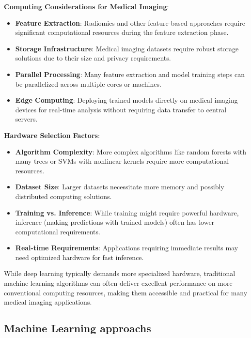 \textbf{Computing Considerations for Medical Imaging}:
\begin{itemize}
  \item \textbf{Feature Extraction}: Radiomics and other feature-based approaches require significant computational resources during the feature extraction phase.

  \item \textbf{Storage Infrastructure}: Medical imaging datasets require robust storage solutions due to their size and privacy requirements.

  \item \textbf{Parallel Processing}: Many feature extraction and model training steps can be parallelized across multiple cores or machines.

  \item \textbf{Edge Computing}: Deploying trained models directly on medical imaging devices for real-time analysis without requiring data transfer to central servers.
\end{itemize}

\textbf{Hardware Selection Factors}:
\begin{itemize}
  \item \textbf{Algorithm Complexity}: More complex algorithms like random forests with many trees or SVMs with nonlinear kernels require more computational resources.

  \item \textbf{Dataset Size}: Larger datasets necessitate more memory and possibly distributed computing solutions.

  \item \textbf{Training vs. Inference}: While training might require powerful hardware, inference (making predictions with trained models) often has lower computational requirements.

  \item \textbf{Real-time Requirements}: Applications requiring immediate results may need optimized hardware for fast inference.
\end{itemize}

While deep learning typically demands more specialized hardware, traditional machine learning algorithms can often deliver excellent performance on more conventional computing resources, making them accessible and practical for many medical imaging applications.

\subsection{Machine Learning approachs}
